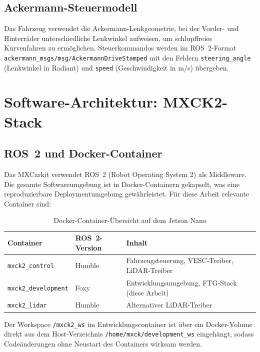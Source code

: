 \subsection{Ackermann-Steuermodell}

Das Fahrzeug verwendet die Ackermann-Lenkgeometrie, bei der Vorder- und
Hinterräder unterschiedliche Lenkwinkel aufweisen, um schlupffreies
Kurvenfahren zu ermöglichen. Steuerkommandos werden im ROS~2-Format
\texttt{ackermann\_msgs/msg/AckermannDriveStamped} mit den Feldern
\texttt{steering\_angle} (Lenkwinkel in Radiant) und
\texttt{speed} (Geschwindigkeit in m/s) übergeben.

\section{Software-Architektur: MXCK2-Stack}

\subsection{ROS~2 und Docker-Container}

Das MXCarkit verwendet ROS~2 (Robot Operating System 2) als Middleware.
Die gesamte Softwareumgebung ist in Docker-Containern gekapselt, was
eine reproduzierbare Deploymentumgebung gewährleistet. Für diese Arbeit
relevante Container sind:

\begin{table}[H]
\centering
\caption{Docker-Container-Übersicht auf dem Jetson Nano}
\label{tab:containers}
\begin{tabularx}{\textwidth}{llX}
\toprule
\textbf{Container} & \textbf{ROS~2-Version} & \textbf{Inhalt} \\
\midrule
\texttt{mxck2\_control}     & Humble & Fahrzeugsteuerung, VESC-Treiber, LiDAR-Treiber \\
\texttt{mxck2\_development} & Foxy   & Entwicklungsumgebung, FTG-Stack (diese Arbeit) \\
\texttt{mxck2\_lidar}       & Humble & Alternativer LiDAR-Treiber \\
\bottomrule
\end{tabularx}
\end{table}

Der Workspace \texttt{/mxck2\_ws} im Entwicklungscontainer ist über ein
Docker-Volume direkt aus dem Host-Verzeichnis
\texttt{/home/mxck/development\_ws} eingehängt, sodass Codeänderungen
ohne Neustart des Containers wirksam werden.

